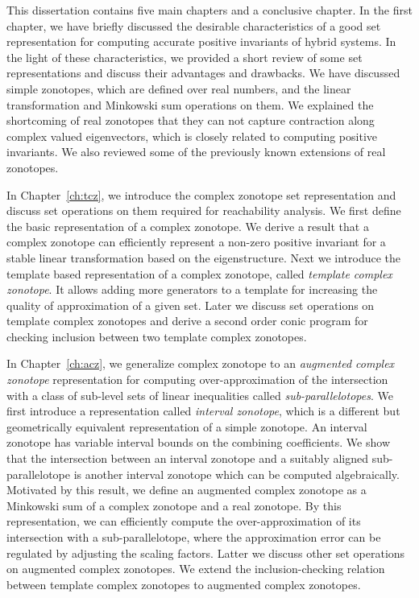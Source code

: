 This dissertation contains five main chapters and a conclusive
chapter.  In the first chapter, we have briefly discussed the
desirable characteristics of a good set representation for computing
accurate positive invariants of hybrid systems.  In the light of these
characteristics, we provided a short review of some set
representations and discuss their advantages and drawbacks.  We have
discussed simple zonotopes, which are defined over real numbers, and
the linear transformation and Minkowski sum operations on them. We
explained the shortcoming of real zonotopes that they can not capture
contraction along complex valued eigenvectors, which is closely
related to computing positive invariants.  We also reviewed some of
the previously known extensions of real zonotopes.

In Chapter~\ref{ch:tcz}, we introduce the complex zonotope set
representation and discuss set operations on them required for
reachability analysis.  We first define the basic representation of a
complex zonotope.  We derive a result that a complex zonotope can
efficiently represent a non-zero positive invariant for a stable
linear transformation based on the eigenstructure.  Next we introduce
the template based representation of a complex zonotope, called
\emph{template complex zonotope}.  It allows adding more generators to
a template for increasing the quality of approximation of a given set.
Later we discuss set operations on template complex zonotopes and
derive a second order conic program for checking inclusion between two
template complex zonotopes.

In Chapter~\ref{ch:acz}, we generalize complex zonotope to an
\emph{augmented complex zonotope} representation for computing
over-approximation of the intersection with a class of sub-level sets
of linear inequalities called \emph{sub-parallelotopes}.  We first
introduce a representation called \emph{interval zonotope}, which is a
different but geometrically equivalent representation of a simple
zonotope.  An interval zonotope has variable interval bounds on the
combining coefficients.  We show that the intersection between an
interval zonotope and a suitably aligned sub-parallelotope is another
interval zonotope which can be computed algebraically.  Motivated by
this result, we define an augmented complex zonotope as a Minkowski
sum of a complex zonotope and a real zonotope.  By this
representation, we can efficiently compute the over-approximation of
its intersection with a sub-parallelotope, where the approximation
error can be regulated by adjusting the scaling factors.  Latter we
discuss other set operations on augmented complex zonotopes.  We
extend the inclusion-checking relation between template complex
zonotopes to augmented complex zonotopes.

